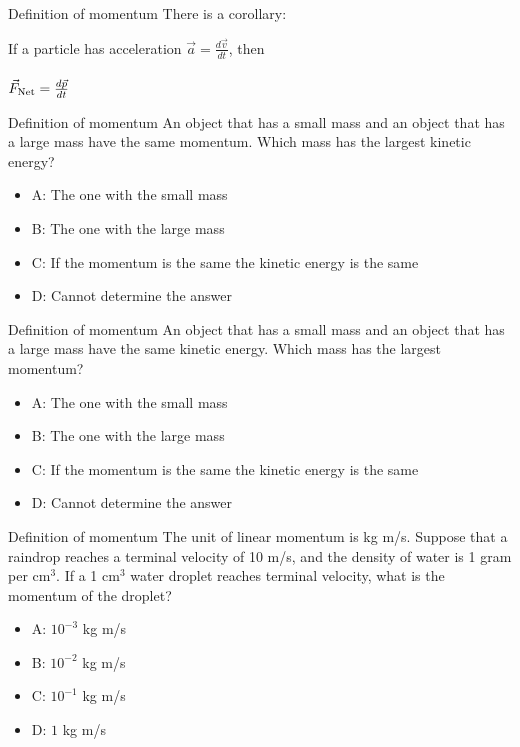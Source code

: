 \documentclass{beamer}
\begin{document}
\begin{frame}{Definition of momentum}
There is a corollary: \\ \vspace{1cm}
\begin{tcolorbox}[colback=white,colframe=red!40!blue,title=Newton's Second Law with momentum]
\alert{If a particle has acceleration $\vec{a} = \frac{d\vec{v}}{dt}$, then} \\ \\
\alert{$\vec{F}_{\rm Net} = \frac{d\vec{p}}{dt}$}
\end{tcolorbox}
\end{frame}

\begin{frame}{Definition of momentum}
An object that has a small mass and an object that has a large mass have the same momentum. Which mass has the largest kinetic energy?
\begin{itemize}
\item A: The one with the small mass
\item B: The one with the large mass
\item C: If the momentum is the same the kinetic energy is the same
\item D: Cannot determine the answer
\end{itemize}
\end{frame}

\begin{frame}{Definition of momentum}
An object that has a small mass and an object that has a large mass have the same kinetic energy. Which mass has the largest momentum?
\begin{itemize}
\item A: The one with the small mass
\item B: The one with the large mass
\item C: If the momentum is the same the kinetic energy is the same
\item D: Cannot determine the answer
\end{itemize}
\end{frame}

\begin{frame}{Definition of momentum}
The unit of linear momentum is kg m/s.  Suppose that a raindrop reaches a terminal velocity of 10 m/s, and the density of water is 1 gram per cm$^3$.  If a 1 cm$^3$ water droplet reaches terminal velocity, what is the momentum of the droplet?
\begin{itemize}
\item A: $10^{-3}$ kg m/s
\item B: $10^{-2}$ kg m/s
\item C: $10^{-1}$ kg m/s
\item D: $1$ kg m/s
\end{itemize}
\end{frame}
\end{document}
